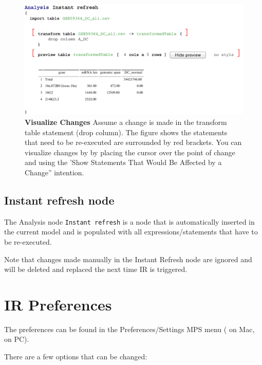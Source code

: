 \begin{figure}[h!tbp]
  \centering
  \includegraphics[width=\figWidthWide]{figures/IRChangedStatements.pdf}
\caption[Visualize Changes]{\textbf{Visualize Changes} Assume a change is made in the transform table statement (drop column). The figure shows the statements that need to be re-executed are surrounded by red brackets. You can visualize changes by by placing the cursor over the point of change and using the 'Show Statements That Would Be Affected by a Change'' intention.}
\end{figure}

\subsection{Instant refresh node}
The Analysis node \texttt{Instant refresh} is a node that is automatically inserted in the current model and is populated with all expressions/statements
that have to be re-executed. 

\begin{remark}
Note that changes made manually in the Instant Refresh node are ignored and will be deleted and replaced the next time IR is triggered.
\end{remark}


\section{IR Preferences}
The preferences can be found in the Preferences/Settings MPS menu ( on Mac, \allowbreak
{}  on PC). 

There are a few options that can be changed:

